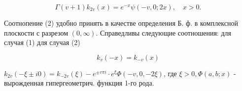\documentclass[10pt]{article}
\begin{document}
\[

\Gamma(v+1) k_{2 v}(x)=e^{-x} \psi(-v, 0 ; 2 x), \quad x>0 .

\]



Соотнопение (2) удобно принять в качестве определения Б. ф. в комплексной плоскости с разрезом $(0, \infty)$. Справедливы следующие соотношения: для случая (1) для случая (2)



\[

k_{v}(-x)=k_{-v}(x)

\]



$k_{2 v}(-\xi \pm i 0)=k_{-2 v}(\xi)-e^{ \pm v \pi i} \cdot e^{\xi} \Phi(-v, 0,-2 \xi)$, где $\xi>0, \Phi(a, b ; x)$ - вырожденная гипергеометрич. функция 1-го рода.
\end{document}
